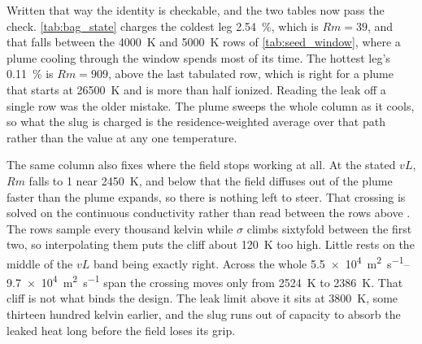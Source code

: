 \documentclass{article}
\begin{document}
Written that way the identity is checkable, and the two tables now pass the check. \autoref{tab:bag_state} charges the coldest leg \SI{2.54}{\percent}, which is $Rm = 39$, and that falls between the \SI{4000}{\kelvin} and \SI{5000}{\kelvin} rows of \autoref{tab:seed_window}, where a plume cooling through the window spends most of its time. The hottest leg's \SI{0.11}{\percent} is $Rm = 909$, above the last tabulated row, which is right for a plume that starts at \SI{26500}{\kelvin} and is more than half ionized. Reading the leak off a single row was the older mistake. The plume sweeps the whole column as it cools, so what the slug is charged is the residence-weighted average over that path rather than the value at any one temperature.

The same column also fixes where the field stops working at all. At the stated $vL$, $Rm$ falls to 1 near \SI{2450}{\kelvin}, and below that the field diffuses out of the plume faster than the plume expands, so there is nothing left to steer. That crossing is solved on the continuous conductivity rather than read between the rows above \cite{Katz_puffsat_impact_sim_2026}. The rows sample every thousand kelvin while $\sigma$ climbs sixtyfold between the first two, so interpolating them puts the cliff about \SI{120}{\kelvin} too high. Little rests on the middle of the $vL$ band being exactly right. Across the whole \SIrange{5.5e4}{9.7e4}{\square\meter\per\second} span the crossing moves only from \SI{2524}{\kelvin} to \SI{2386}{\kelvin}. That cliff is not what binds the design. The leak limit above it sits at \SI{3800}{\kelvin}, some thirteen hundred kelvin earlier, and the slug runs out of capacity to absorb the leaked heat long before the field loses its grip.
\end{document}
